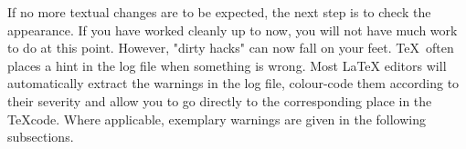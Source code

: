 If no more textual changes are to be expected, the next step is to check the 
appearance. If you have worked cleanly up to now, you will not have much work
to do at this point. However, "dirty hacks" can now fall on your feet.
\TeX\ often places a hint in the log file when something is wrong. Most \LaTeX 
editors will automatically extract the warnings in the log file, colour-code
them according to their severity and allow you to go directly to the
corresponding place in the \TeX code. Where applicable, exemplary warnings are
given in the following subsections.

